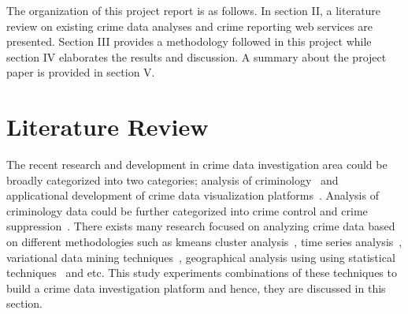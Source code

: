 The organization of this project report is as follows. In section II,
a literature review on existing crime data analyses and crime
reporting web services are presented. Section III provides a
methodology followed in this project while section IV elaborates the
results and discussion. A summary about the project paper is provided
in section V.

\section{Literature Review}

The recent research and development in crime data investigation area
could be broadly categorized into two categories; analysis of
criminology~\cite{hid-sp18-409-agarwal2013crime,
hid-sp18-409-bharathi2014survey, hid-sp18-409-kiani2015analysis,
hid-sp18-409-nath2006crime, hid-sp18-409-gera2014city} and
applicational development of crime data visualization
platforms~\cite{hid-sp18-409-www-spotcrime,
hid-sp18-409-www-crimereports, hid-sp18-409-www-mylocalcrime,
hid-sp18-409-www-crimemapping}. Analysis of criminology data could be
further categorized into crime control and crime
suppression~\cite{hid-sp18-409-agarwal2013crime}. There exists many
research focused on analyzing crime data based on different
methodologies such as kmeans cluster
analysis~\cite{hid-sp18-409-gera2014city, hid-sp18-409-nath2006crime,
hid-sp18-409-agarwal2013crime}, time series
analysis~\cite{hid-sp18-409-wei2006time}, variational data mining
techniques~\cite{hid-sp18-409-chen2004crime}, geographical analysis
using using statistical techniques~\cite{hid-sp18-409-santos2016crime}
and etc. This study experiments combinations of these techniques to
build a crime data investigation platform and hence, they are
discussed in this section.

